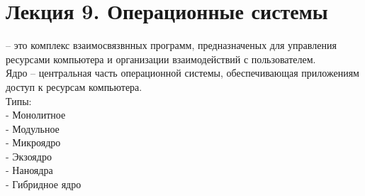 \documentclass[a4paper, 12pt]{article}
\begin{document}
\section*{Лекция 9. Операционные системы}
-- это комплекс взаимосвязвнных программ, предназначеных для управления ресурсами компьютера и организации взаимодействий с пользователем.\\

Ядро -- центральная часть операционной системы, обеспечивающая приложениям доступ к ресурсам компьютера.\\

Типы:\\
- Монолитное\\
- Модульное\\
- Микроядро\\
- Экзоядро\\
- Наноядра\\
- Гибридное ядро\\
\end{document}
